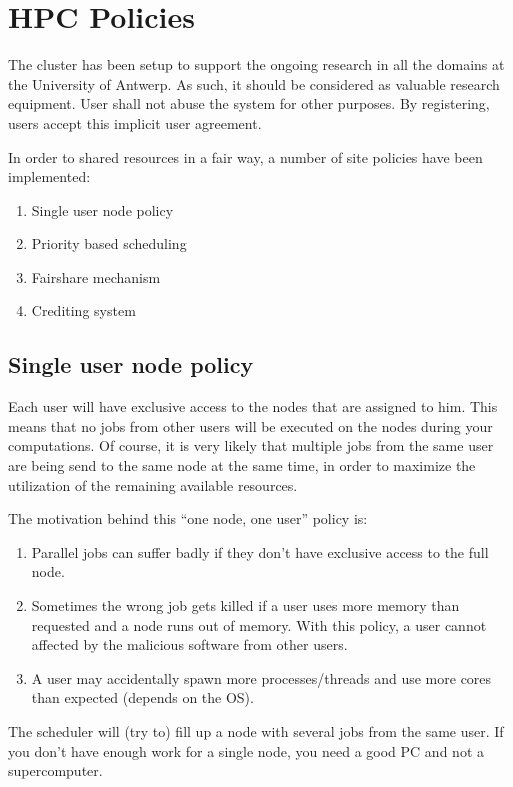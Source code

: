 \chapter{HPC Policies}
\label{ch:hpc-policies}

The cluster has been setup to support the ongoing research in all the domains
at the University of Antwerp.  As such, it should be considered as valuable
research equipment.  User shall not abuse the system for other purposes. By
registering, users accept this implicit user agreement.

In order to shared resources in a fair way, a number of site policies have been
implemented:

\begin{enumerate}
\item  Single user node policy
\item  Priority based scheduling
\item  Fairshare mechanism
\item  Crediting system
\end{enumerate}


\section{Single user node policy}

Each user will have exclusive access to the nodes that are assigned to him.
This means that no jobs from other users will be executed on the nodes during
your computations.  Of course, it is very likely that multiple jobs from the
same user are being send to the same node at the same time, in order to
maximize the utilization of the remaining available resources.

The motivation behind this ``one node, one user'' policy is:

\begin{enumerate}
\item  Parallel jobs can suffer badly if they don't have exclusive access to the full node.
\item  Sometimes the wrong job gets killed if a user uses more memory than requested and a node runs out of memory.  With this policy, a user cannot affected by the malicious software from other users.
\item  A user may accidentally spawn more processes/threads and use more cores than expected (depends on the OS).
\end{enumerate}

The scheduler will (try to) fill up a node with several jobs from the same
user. If you don't have enough work for a single node, you need a good PC and
not a supercomputer.


